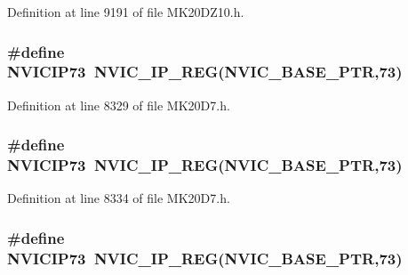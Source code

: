 Definition at line 9191 of file M\+K20\+D\+Z10.\+h.

\subsubsection[{\texorpdfstring{N\+V\+I\+C\+I\+P73}{NVICIP73}}]{\setlength{\rightskip}{0pt plus 5cm}\#define N\+V\+I\+C\+I\+P73~{\bf N\+V\+I\+C\+\_\+\+I\+P\+\_\+\+R\+EG}({\bf N\+V\+I\+C\+\_\+\+B\+A\+S\+E\+\_\+\+P\+TR},73)}\hypertarget{group___n_v_i_c___register___accessor___macros_ga09bb6087e04cbbbf34d39464c2a14f62}{}\label{group___n_v_i_c___register___accessor___macros_ga09bb6087e04cbbbf34d39464c2a14f62}


Definition at line 8329 of file M\+K20\+D7.\+h.

\subsubsection[{\texorpdfstring{N\+V\+I\+C\+I\+P73}{NVICIP73}}]{\setlength{\rightskip}{0pt plus 5cm}\#define N\+V\+I\+C\+I\+P73~{\bf N\+V\+I\+C\+\_\+\+I\+P\+\_\+\+R\+EG}({\bf N\+V\+I\+C\+\_\+\+B\+A\+S\+E\+\_\+\+P\+TR},73)}\hypertarget{group___n_v_i_c___register___accessor___macros_ga09bb6087e04cbbbf34d39464c2a14f62}{}\label{group___n_v_i_c___register___accessor___macros_ga09bb6087e04cbbbf34d39464c2a14f62}


Definition at line 8334 of file M\+K20\+D7.\+h.

\subsubsection[{\texorpdfstring{N\+V\+I\+C\+I\+P73}{NVICIP73}}]{\setlength{\rightskip}{0pt plus 5cm}\#define N\+V\+I\+C\+I\+P73~{\bf N\+V\+I\+C\+\_\+\+I\+P\+\_\+\+R\+EG}({\bf N\+V\+I\+C\+\_\+\+B\+A\+S\+E\+\_\+\+P\+TR},73)}\hypertarget{group___n_v_i_c___register___accessor___macros_ga09bb6087e04cbbbf34d39464c2a14f62}{}\label{group___n_v_i_c___register___accessor___macros_ga09bb6087e04cbbbf34d39464c2a14f62}


